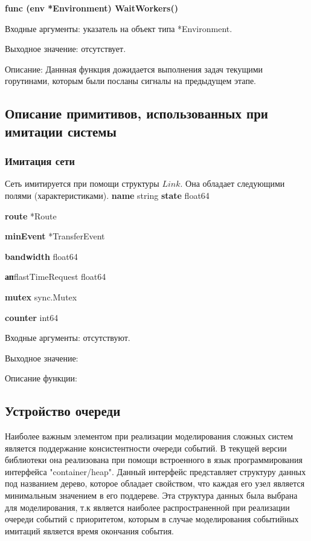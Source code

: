 \textbf{func (env *Environment) WaitWorkers() }

Входные аргументы: указатель на объект типа *Environment.

Выходное значение: отсутствует. 

Описание: Даннная функция дожидается выполнения задач текущими горутинами, которым были посланы сигналы на предыдущем этапе.



\subsection{Описание примитивов, использованных при имитации системы}

\subsubsection{Имитация сети}

Сеть имитируется при помощи структуры $Link$. Она обладает следующими полями (характеристиками). 
\textbf{name}
	  string
\textbf{state}	 float64

\textbf{route}	 *Route

\textbf{minEvent}	  *TransferEvent

\textbf{bandwidth}	 float64

\textbf{ап}f{lastTimeRequest}	 float64

\textbf{mutex}	           sync.Mutex

\textbf{counter}	  int64


Входные аргументы: отсутствуют.

Выходное значение:

Описание функции:
\subsection{Устройство очереди}

Наиболее важным элементом при реализации моделирования сложных систем является поддержание консистентности очереди событий. В текущей версии библиотеки она реализована при помощи встроенного в язык программирования интерфейса "container/heap". Данный интерфейс представляет структуру данных под названием дерево, которое обладает свойством, что каждая его узел является минимальным значением в его поддереве. Эта структура данных была выбрана для моделирования, т.к является наиболее распространенной при реализации очереди событий с приоритетом, которым в случае моделирования событийных имитаций является время окончания события. 

